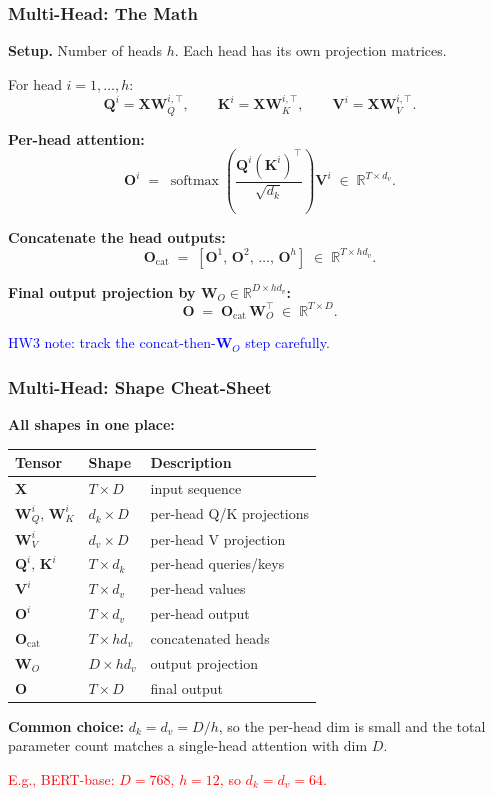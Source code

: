 \documentclass[notes,11pt, aspectratio=169]{beamer}
\DeclareMathOperator{\softmax}{softmax}
\newcommand{\vK}{\mathbf{K}}
\newcommand{\vQ}{\mathbf{Q}}
\newcommand{\vV}{\mathbf{V}}
\newcommand{\vW}{\mathbf{W}}
\newcommand{\vX}{\mathbf{X}}
\newcommand{\vO}{\mathbf{O}}
\newcommand{\R}{\mathbb{R}}
\begin{document}
\begin{frame}
\frametitle{Multi-Head: The Math}

\textbf{Setup.} Number of heads $h$. Each head has its own projection matrices.

\vspace{4pt}
For head $i = 1, \ldots, h$:
\[
    \vQ^i = \vX \vW_Q^{i,\top}, \qquad \vK^i = \vX \vW_K^{i,\top}, \qquad \vV^i = \vX \vW_V^{i,\top}.
\]

\vspace{6pt}
\textbf{Per-head attention:}
\[
    \vO^i \;=\; \softmax\!\left(\frac{\vQ^i (\vK^i)^\top}{\sqrt{d_k}}\right) \vV^i \;\in\; \R^{T \times d_v}.
\]

\vspace{8pt}
\textbf{Concatenate the head outputs:}
\[
    \vO_\text{cat} \;=\; [\vO^1,\, \vO^2,\, \ldots,\, \vO^h] \;\in\; \R^{T \times h d_v}.
\]

\vspace{6pt}
\textbf{Final output projection by $\vW_O \in \R^{D \times h d_v}$:}
\[
    \vO \;=\; \vO_\text{cat}\, \vW_O^\top \;\in\; \R^{T \times D}.
\]

\vfill
{\scriptsize\textcolor{blue}{HW3 note: track the concat-then-$\vW_O$ step carefully.}}
\end{frame}

\begin{frame}
\frametitle{Multi-Head: Shape Cheat-Sheet}

\textbf{All shapes in one place:}

\vspace{4pt}
\begin{center}
\renewcommand{\arraystretch}{1.18}
\scriptsize
\begin{tabular}{l l l}
\toprule
\textbf{Tensor} & \textbf{Shape} & \textbf{Description} \\
\midrule
$\vX$ & $T \times D$ & input sequence \\
$\vW_Q^i,\, \vW_K^i$ & $d_k \times D$ & per-head Q/K projections \\
$\vW_V^i$ & $d_v \times D$ & per-head V projection \\
$\vQ^i,\, \vK^i$ & $T \times d_k$ & per-head queries/keys \\
$\vV^i$ & $T \times d_v$ & per-head values \\
$\vO^i$ & $T \times d_v$ & per-head output \\
$\vO_\text{cat}$ & $T \times h d_v$ & concatenated heads \\
$\vW_O$ & $D \times h d_v$ & output projection \\
$\vO$ & $T \times D$ & final output \\
\bottomrule
\end{tabular}
\end{center}

\vspace{4pt}
\textbf{Common choice:} $d_k = d_v = D / h$, so the per-head dim is small and the total parameter count matches a single-head attention with dim $D$.

\vspace{2pt}
\textcolor{red}{E.g., BERT-base: $D = 768$, $h = 12$, so $d_k = d_v = 64$.}
\end{frame}
\end{document}
